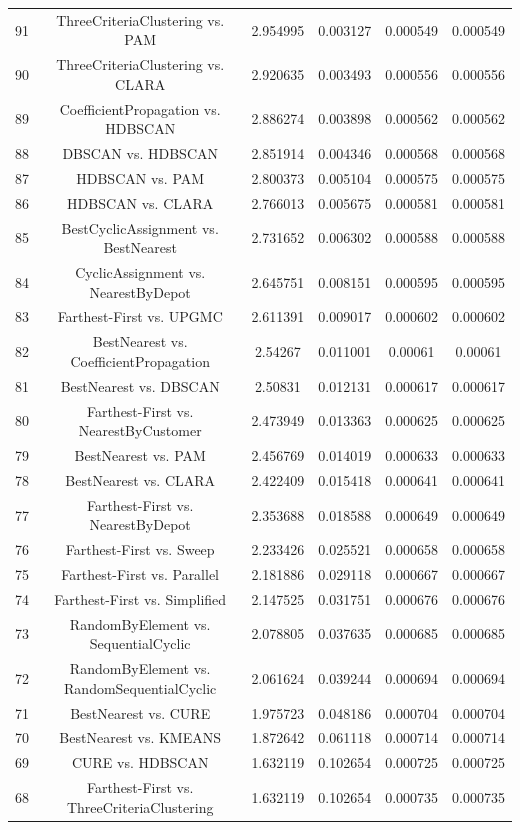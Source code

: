 \documentclass[a4paper,10pt]{article}
\begin{document}
\begin{landscape}
\begin{table}[!htp]
\begin{tabular}{cccccc}
91&ThreeCriteriaClustering vs. PAM&2.954995&0.003127&0.000549&0.000549\\
90&ThreeCriteriaClustering vs. CLARA&2.920635&0.003493&0.000556&0.000556\\
89&CoefficientPropagation vs. HDBSCAN&2.886274&0.003898&0.000562&0.000562\\
88&DBSCAN vs. HDBSCAN&2.851914&0.004346&0.000568&0.000568\\
87&HDBSCAN vs. PAM&2.800373&0.005104&0.000575&0.000575\\
86&HDBSCAN vs. CLARA&2.766013&0.005675&0.000581&0.000581\\
85&BestCyclicAssignment vs. BestNearest&2.731652&0.006302&0.000588&0.000588\\
84&CyclicAssignment vs. NearestByDepot&2.645751&0.008151&0.000595&0.000595\\
83&Farthest-First vs. UPGMC&2.611391&0.009017&0.000602&0.000602\\
82&BestNearest vs. CoefficientPropagation&2.54267&0.011001&0.00061&0.00061\\
81&BestNearest vs. DBSCAN&2.50831&0.012131&0.000617&0.000617\\
80&Farthest-First vs. NearestByCustomer&2.473949&0.013363&0.000625&0.000625\\
79&BestNearest vs. PAM&2.456769&0.014019&0.000633&0.000633\\
78&BestNearest vs. CLARA&2.422409&0.015418&0.000641&0.000641\\
77&Farthest-First vs. NearestByDepot&2.353688&0.018588&0.000649&0.000649\\
76&Farthest-First vs. Sweep&2.233426&0.025521&0.000658&0.000658\\
75&Farthest-First vs. Parallel&2.181886&0.029118&0.000667&0.000667\\
74&Farthest-First vs. Simplified&2.147525&0.031751&0.000676&0.000676\\
73&RandomByElement vs. SequentialCyclic&2.078805&0.037635&0.000685&0.000685\\
72&RandomByElement vs. RandomSequentialCyclic&2.061624&0.039244&0.000694&0.000694\\
71&BestNearest vs. CURE&1.975723&0.048186&0.000704&0.000704\\
70&BestNearest vs. KMEANS&1.872642&0.061118&0.000714&0.000714\\
69&CURE vs. HDBSCAN&1.632119&0.102654&0.000725&0.000725\\
68&Farthest-First vs. ThreeCriteriaClustering&1.632119&0.102654&0.000735&0.000735\\

\end{tabular}
\end{table}
\end{landscape}
\end{document}
